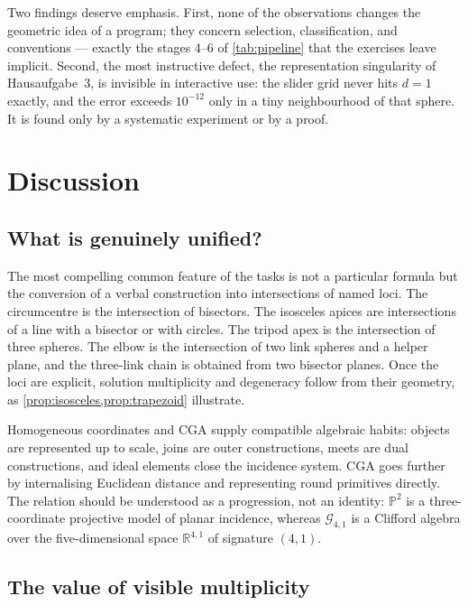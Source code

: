 \documentclass[11pt,a4paper]{article}
\theoremstyle{plain}
\theoremstyle{definition}
\theoremstyle{remark}
\newcommand{\R}{\mathbb{R}}
\newcommand{\PP}{\mathbb{P}}
\newcommand{\GA}{\mathcal{G}_{4,1}}
\begin{document}
Two findings deserve emphasis. First, none of the observations changes the
geometric idea of a program; they concern selection, classification, and
conventions --- exactly the stages 4--6 of \cref{tab:pipeline} that the
exercises leave implicit. Second, the most instructive defect, the
representation singularity of Hausaufgabe~3, is invisible in interactive use:
the slider grid never hits $d=1$ exactly, and the error exceeds $10^{-12}$ only in
a tiny neighbourhood of that sphere. It is found only by a systematic
experiment or by a proof.

\section{Discussion}\label{sec:discussion}

\subsection{What is genuinely unified?}

The most compelling common feature of the tasks is not a particular formula but
the conversion of a verbal construction into intersections of named loci. The
circumcentre is the intersection of bisectors. The isosceles apices are
intersections of a line with a bisector or with circles. The tripod apex is the
intersection of three spheres. The elbow is the intersection of two link
spheres and a helper plane, and the three-link chain is obtained from two
bisector planes. Once the loci are explicit, solution multiplicity and
degeneracy follow from their geometry, as \cref{prop:isosceles,prop:trapezoid}
illustrate.

Homogeneous coordinates and CGA supply compatible algebraic habits: objects are
represented up to scale, joins are outer constructions, meets are dual
constructions, and ideal elements close the incidence system. CGA goes further
by internalising Euclidean distance and representing round primitives directly.
The relation should be understood as a progression, not an identity: $\PP^2$ is a
three-coordinate projective model of planar incidence, whereas $\GA$ is a
Clifford algebra over the five-dimensional space $\R^{4,1}$ of signature
$(4,1)$.

\subsection{The value of visible multiplicity}
\end{document}
